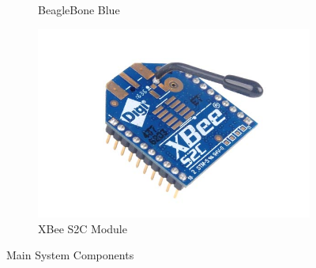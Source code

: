 \begin{figure}[H]
\begin{subfigure}[t]{0.32\textwidth}
    \captionsetup{width=\textwidth}
    \caption{BeagleBone Blue}
    \label{fig:beagleboneBlue}
  \end{subfigure}
  \begin{subfigure}[t]{0.32\textwidth}
    \includegraphics[width=1\textwidth]{figs/img/Xbee-S2C-Module}
    \captionsetup{width=\textwidth}
    \caption{XBee S2C Module}
    \label{fig:XBeeModule}
  \end{subfigure}
  \caption{Main System Components}
\end{figure}

